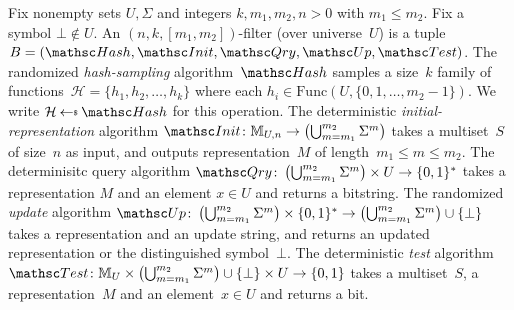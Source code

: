 Fix nonempty sets $U,\Sigma$ and integers $k,m_1,m_2,n>0$ with $m_1 \leq m_2$.  Fix a symbol $\bot \not\in U$.  An $(n,k,[m_1,m_2])$-filter (over universe~$U$) is a tuple  $B=(\Hash,\Init,\Qry,\Update, \Test)$.   
%
The randomized \emph{hash-sampling} algorithm~$\Hash$ samples a size~$k$ family of functions~$\mathcal{H}=\{h_1,h_2,\ldots,h_k\}$ where each $h_i \in  \mathrm{Func}(U,\{0,1,\ldots,m_2-1\})$.  We write $\mathcal{H} \getsr \Hash$ for this operation. 
%
The deterministic \emph{initial-representation} algorithm $\Init\colon \multiset{U,n} \rightarrow \left(\bigcup_{m=m_1}^{m_2}\Sigma^m\right)$ takes a multiset~$S$ of size~$n$ as input, and outputs representation~$M$ of length~$m_1 \leq m \leq m_2$.
%
The determinisitc query algorithm $\Qry\colon \left(\bigcup_{m=m_1}^{m_2}\Sigma^m \right)\times U \rightarrow \bits^*$ takes a representation $M$ and an element $x \in U$ and returns a bitstring.  
%
The randomized \emph{update} algorithm $\Update\colon \left(\bigcup_{m=m_1}^{m_2}\Sigma^m \right)\times \bits^* \rightarrow \left(\bigcup_{m=m_1}^{m_2}\Sigma^m \right) \cup \{\bot\}$ takes a representation and an update string, and returns an updated representation or the distinguished symbol~$\bot$.  
%
The deterministic \emph{test} algorithm $\Test \colon \multiset{U}\times \left(\bigcup_{m=m_1}^{m_2}\Sigma^m \right)\cup\{\bot\} \times U \rightarrow \bits$ takes a multiset~$S$, a representation~$M$ and an element~$x \in U$ and returns a bit.
%

